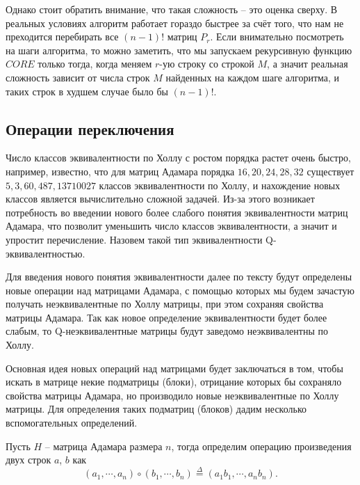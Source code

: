 \documentclass[a4paper, 14pt]{extreport}
\begin{document}
Однако стоит обратить внимание, что такая сложность -- это оценка сверху. В реальных условиях алгоритм работает гораздо быстрее за счёт того, что нам не преходится перебирать все $(n-1)!$ матриц $P_r$. Если внимательно посмотреть на шаги алгоритма, то можно заметить, что мы запускаем рекурсивную функцию $CORE$ только тогда, когда меняем $r$-ую строку со строкой $M$, а значит реальная сложность зависит от числа строк $M$ найденных на каждом шаге алгоритма, и таких строк в худшем случае было бы $(n-1)!$.

\subsection{Операции переключения}

Число классов эквивалентности по Холлу с ростом порядка растет очень быстро, например, известно, что для матриц Адамара порядка $16, 20, 24, 28, 32$ существует $5, 3, 60, 487, 13710027$ классов эквивалентности по Холлу, и нахождение новых классов является вычислительно сложной задачей. Из-за этого возникает потребность во введении нового более слабого понятия эквивалентности матриц Адамара, что позволит уменьшить число классов эквивалентности, а значит и упростит перечисление. Назовем такой тип эквивалентности Q-эквивалентностью.

Для введения нового понятия эквивалентности далее по тексту будут определены новые операции над матрицами Адамара, с помощью которых мы будем зачастую получать неэквивалентные по Холлу матрицы, при этом сохраняя свойства матрицы Адамара. Так как новое определение эквивалентности будет более слабым, то Q-неэквивалентные матрицы будут заведомо неэквивалентны по Холлу.

Основная идея новых операций над матрицами будет заключаться в том, чтобы искать в матрице некие подматрицы (блоки), отрицание которых бы сохраняло свойства матрицы Адамара, но производило новые неэквивалентные по Холлу матрицы. Для определения таких подматриц (блоков) дадим несколько вспомогательных определений.

\begin{Df}\normalfont\label{df:norm3}
    Пусть $H$ -- матрица Адамара размера $n$, тогда определим операцию { произведения} двух строк $a$, $b$ как
    \begin{equation}
        (a_1, \cdots, a_n) \circ (b_1, \cdots, b_n) \overset{\Delta}{=} (a_1b_1, \cdots, a_nb_n).
    \end{equation}
\end{Df}
\end{document}
